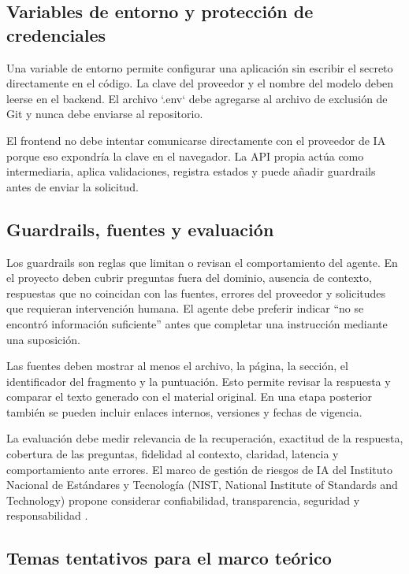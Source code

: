 \subsection{Variables de entorno y protección de credenciales}

Una variable de entorno permite configurar una aplicación sin escribir el secreto directamente en el código. La clave del proveedor y el nombre del modelo deben leerse en el backend. El archivo `.env` debe agregarse al archivo de exclusión de Git y nunca debe enviarse al repositorio.

El frontend no debe intentar comunicarse directamente con el proveedor de IA porque eso expondría la clave en el navegador. La API propia actúa como intermediaria, aplica validaciones, registra estados y puede añadir guardrails antes de enviar la solicitud.

\subsection{Guardrails, fuentes y evaluación}

Los guardrails son reglas que limitan o revisan el comportamiento del agente. En el proyecto deben cubrir preguntas fuera del dominio, ausencia de contexto, respuestas que no coincidan con las fuentes, errores del proveedor y solicitudes que requieran intervención humana. El agente debe preferir indicar ``no se encontró información suficiente'' antes que completar una instrucción mediante una suposición.

Las fuentes deben mostrar al menos el archivo, la página, la sección, el identificador del fragmento y la puntuación. Esto permite revisar la respuesta y comparar el texto generado con el material original. En una etapa posterior también se pueden incluir enlaces internos, versiones y fechas de vigencia.

La evaluación debe medir relevancia de la recuperación, exactitud de la respuesta, cobertura de las preguntas, fidelidad al contexto, claridad, latencia y comportamiento ante errores. El marco de gestión de riesgos de IA del Instituto Nacional de Estándares y Tecnología (NIST, National Institute of Standards and Technology) propone considerar confiabilidad, transparencia, seguridad y responsabilidad \citep{nistAirmf}.

\subsection{Temas tentativos para el marco teórico}

